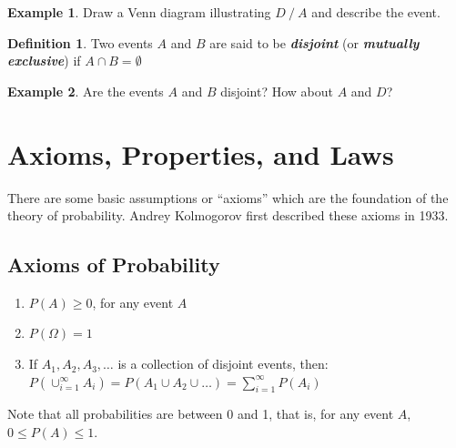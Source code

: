 \documentclass[
  11pt,
]{book}
\providecommand{\tightlist}{%
  \setlength{\itemsep}{0pt}\setlength{\parskip}{0pt}}
\theoremstyle{definition}
\newtheorem{definition}{Definition}[chapter]
\theoremstyle{definition}
\newtheorem{example}{Example}[chapter]
\theoremstyle{definition}
\theoremstyle{definition}
\theoremstyle{remark}
\begin{document}
\begin{example}
Draw a Venn diagram illustrating \(D \mathbin{/} A\) and describe the event.
\end{example}

\hfill\break
\hfill\break
\hfill\break
\hfill\break
\hfill\break
\vfill

\begin{definition}
Two events \(A\) and \(B\) are said to be \textbf{\emph{disjoint}} (or \textbf{\emph{mutually exclusive}}) if \(A \cap B = \emptyset\)
\end{definition}

\begin{example}
Are the events \(A\) and \(B\) disjoint? How about \(A\) and \(D\)?
\end{example}

\hfill\break
\hfill\break
\hfill\break
\hfill\break
\hfill\break
\vfill

\newpage

\hypertarget{axioms-properties-and-laws}{%
\section{Axioms, Properties, and Laws}\label{axioms-properties-and-laws}}

There are some basic assumptions or ``axioms'' which are the foundation of the theory of probability. Andrey Kolmogorov first described these axioms in 1933.

\hypertarget{axioms-of-probability}{%
\subsection{Axioms of Probability}\label{axioms-of-probability}}

\begin{enumerate}
\def\labelenumi{\arabic{enumi}.}
\tightlist
\item
  \(P(A) \geq 0\), for any event \(A\)\\
\item
  \(P(\Omega) = 1\)\\
\item
  If \(A_1, A_2, A_3, \ldots\) is a collection of disjoint events, then:\\
  \(P(\cup_{i=1}^{\infty} A_i) = P(A_1 \cup A_2 \cup \ldots ) = \sum_{i=1}^{\infty} P(A_i)\)\\
\end{enumerate}

Note that all probabilities are between 0 and 1, that is, for any event \(A\), \(0 \leq P(A) \leq 1\).
\end{document}
